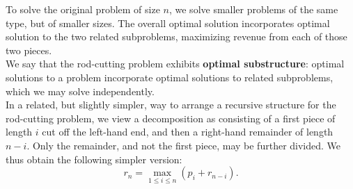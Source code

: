 \documentclass[11pt]{article}
\begin{document}
To solve the original problem of size $n$, we solve smaller problems of the same type, but of smaller sizes. The overall optimal solution incorporates optimal solution to the two related subproblems, maximizing revenue from each of those two pieces. \\

We say that the rod-cutting problem exhibits \textbf{optimal substructure}: optimal solutions to a problem incorporate optimal solutions to related subproblems, which we may solve independently. \\


In a related, but slightly simpler, way to arrange a recursive structure for the rod-cutting problem, we view a decomposition as consisting of a first piece of length $i$ cut off the left-hand end, and then a right-hand remainder of length $n-i$. Only the remainder, and not the first piece, may be further divided. We thus obtain the following simpler version: \\
\begin{equation}
r_n = \max_{1\le i \le n}(p_i + r_{n-i}).
\end{equation}
\end{document}
